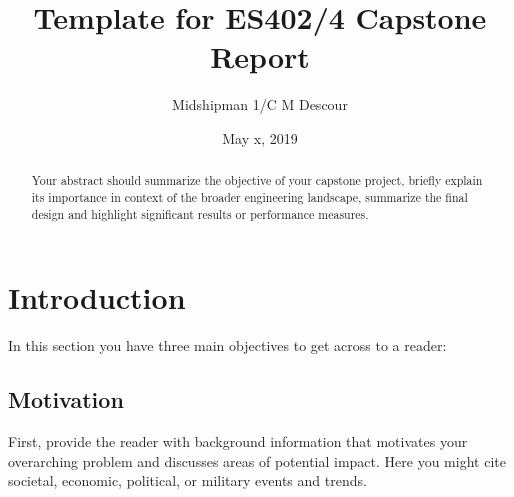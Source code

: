 \documentclass{wrcecapstone}
\title{Template for ES402/4 Capstone Report}
\author{Midshipman 1/C M Descour}
\date{May x, 2019} %
\begin{document}
\maketitlepage
\cleardoublepage
\tableofcontents

\clearpage
\maketitle
\begin{abstract}
Your abstract should summarize the objective of your capstone project, briefly explain its importance in context of the broader engineering landscape, summarize the final design and highlight significant results or performance measures.
\end{abstract}





\section{Introduction}
In this section you have three main objectives to get across to a reader:  

\subsection{Motivation}
First, provide the reader with background information that motivates your overarching problem and discusses areas of potential impact.  Here you might cite societal, economic, political, or military events and trends.
\end{document}
